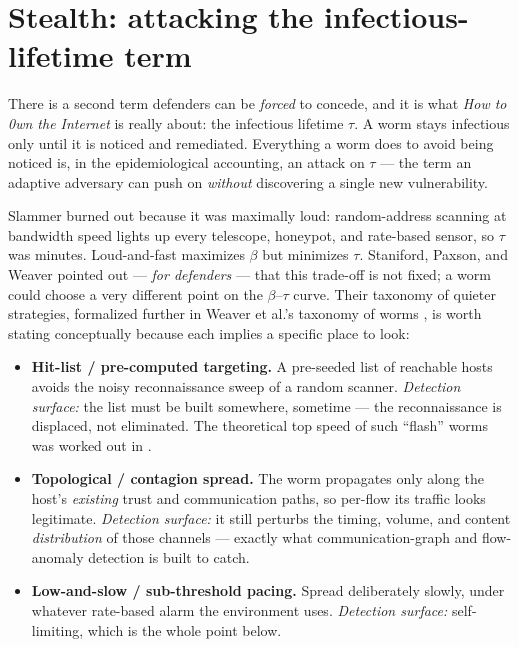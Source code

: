 \documentclass[11pt,a4paper]{article}
\begin{document}
\section{Stealth: attacking the infectious-lifetime term}

There is a second term defenders can be \emph{forced} to concede, and it is what \emph{How to 0wn the Internet} is really about: the infectious lifetime $\tau$. A worm stays infectious only until it is noticed and remediated. Everything a worm does to avoid being noticed is, in the epidemiological accounting, an attack on $\tau$ --- the term an adaptive adversary can push on \emph{without} discovering a single new vulnerability.

Slammer burned out because it was maximally loud: random-address scanning at bandwidth speed lights up every telescope, honeypot, and rate-based sensor, so $\tau$ was minutes. Loud-and-fast maximizes $\beta$ but minimizes $\tau$. Staniford, Paxson, and Weaver pointed out --- \emph{for defenders} --- that this trade-off is not fixed; a worm could choose a very different point on the $\beta$--$\tau$ curve. Their taxonomy of quieter strategies, formalized further in Weaver et al.'s taxonomy of worms \cite{taxonomy}, is worth stating conceptually because each implies a specific place to look:

\begin{itemize}[nosep]
  \item \textbf{Hit-list / pre-computed targeting.} A pre-seeded list of reachable hosts avoids the noisy reconnaissance sweep of a random scanner. \emph{Detection surface:} the list must be built somewhere, sometime --- the reconnaissance is displaced, not eliminated. The theoretical top speed of such ``flash'' worms was worked out in \cite{flash}.
  \item \textbf{Topological / contagion spread.} The worm propagates only along the host's \emph{existing} trust and communication paths, so per-flow its traffic looks legitimate. \emph{Detection surface:} it still perturbs the timing, volume, and content \emph{distribution} of those channels --- exactly what communication-graph and flow-anomaly detection is built to catch.
  \item \textbf{Low-and-slow / sub-threshold pacing.} Spread deliberately slowly, under whatever rate-based alarm the environment uses. \emph{Detection surface:} self-limiting, which is the whole point below.
\end{itemize}
\end{document}
